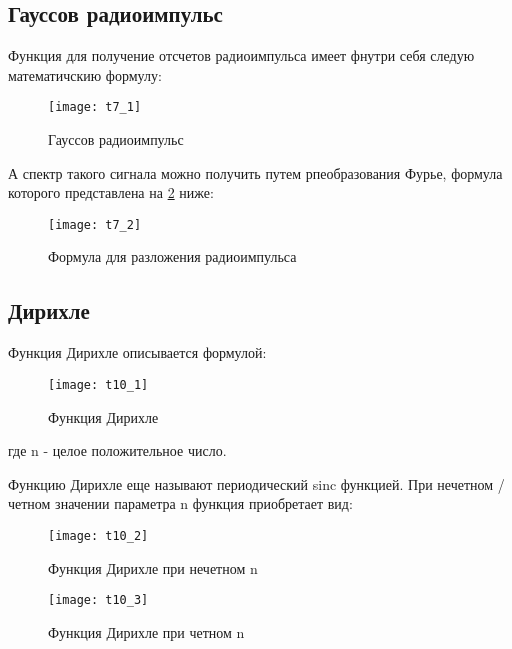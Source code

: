 \subsection{Гауссов радиоимпульс}
Функция для получение отсчетов радиоимпульса имеет фнутри себя следую математичскию формулу:
\begin{figure}[H]
	\begin{center}
		\texttt{[image: t7\_1]}
		\caption{Гауссов радиоимпульс} 
		\label{pic:t7_1} %
	\end{center}
\end{figure}
А спектр такого сигнала можно получить путем рпеобразования Фурье, формула которого представлена на \ref{pic:t7_2} ниже:
\begin{figure}[H]
	\begin{center}
		\texttt{[image: t7\_2]}
		\caption{Формула для разложения радиоимпульса} 
		\label{pic:t7_2} %
	\end{center}
\end{figure}

\subsection{Дирихле}
Функция Дирихле описывается формулой:
\begin{figure}[H]
	\begin{center}
		\texttt{[image: t10\_1]}
		\caption{Функция Дирихле} 
		\label{pic:theor10_1} %
	\end{center}
\end{figure}
где n - целое положительное число.

Функцию Дирихле еще называют периодический sinc функцией.
При нечетном / четном значении параметра n функция приобретает вид:
\begin{figure}[H]
	\begin{center}
		\texttt{[image: t10\_2]}
		\caption{Функция Дирихле при нечетном n} 
		\label{pic:t10_2} %
	\end{center}
\end{figure}
\begin{figure}[H]
	\begin{center}
		\texttt{[image: t10\_3]}
		\caption{Функция Дирихле при четном n} 
		\label{pic:t10_3} %
	\end{center}
\end{figure}

